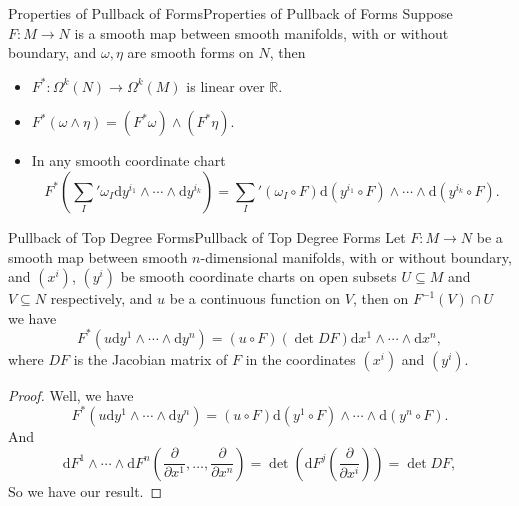 \documentclass[../main.tex]{subfiles}
\begin{document}
\begin{lemma}{Properties of Pullback of Forms}{Properties of Pullback of Forms}
  Suppose $F: M \to N$ is a smooth map between smooth manifolds, with or without boundary, and $\omega, \eta$ are smooth forms on $N$, then
  \begin{itemize}
    \item $F^*: \Omega^k(N) \to \Omega^k(M)$ is linear over $\mathbb{R}$.
    \item $F^*(\omega \wedge \eta) = (F^* \omega) \wedge (F^* \eta)$.
    \item In any smooth coordinate chart
      \begin{equation*}
        F^* \left(\sum_{I}^{}' \omega_I \mathrm{d} y^{i_1} \wedge \cdots \wedge \mathrm{d} y^{i_k}\right) = \sum_{I}^{}' (\omega_I \circ F) \mathrm{d} (y^{i_1} \circ F) \wedge \cdots \wedge \mathrm{d} (y^{i_k} \circ F).
      \end{equation*}
  \end{itemize}
\end{lemma}

\begin{proposition}{Pullback of Top Degree Forms}{Pullback of Top Degree Forms}
  Let $F: M \to N$ be a smooth map between smooth $n$-dimensional manifolds, with or without boundary, and $(x^i)$, $(y^i)$ be smooth coordinate charts on open subsets $U \subseteq M$ and $V \subseteq N$ respectively, and $u$ be a continuous function on $V$, then on $F^{-1}(V) \cap U$ we have
  \begin{equation}
    F^*(u \mathrm{d} y^1 \wedge \cdots \wedge \mathrm{d} y^n) = (u \circ F) (\det D F) \mathrm{d} x^1 \wedge \cdots \wedge \mathrm{d} x^n,
  \end{equation}
  where $D F$ is the Jacobian matrix of $F$ in the coordinates $(x^i)$ and $(y^i)$.
\end{proposition}
\begin{proof}
  Well, we have
  \begin{equation*}
    F^*(u \mathrm{d} y^1 \wedge \cdots \wedge \mathrm{d} y^n) = (u \circ F) \mathrm{d} (y^1 \circ F) \wedge \cdots \wedge \mathrm{d} (y^n \circ F).
  \end{equation*}
  And
  \begin{equation*}
    \mathrm{d} F^1 \wedge \cdots \wedge \mathrm{d} F^n (\frac{\partial }{\partial x^1}, \dots, \frac{\partial }{\partial x^n}) = \det \left(\mathrm{d} F^j(\frac{\partial }{\partial x^i})\right) = \det D F,
  \end{equation*}
  So we have our result.
\end{proof}
\end{document}
